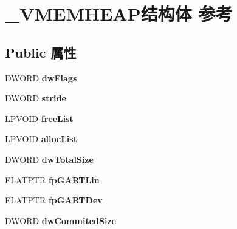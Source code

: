 \hypertarget{struct___v_m_e_m_h_e_a_p}{}\section{\+\_\+\+V\+M\+E\+M\+H\+E\+A\+P结构体 参考}
\label{struct___v_m_e_m_h_e_a_p}
\subsection*{Public 属性}
\begin{DoxyCompactItemize}
\item 
\mbox{\label{struct___v_m_e_m_h_e_a_p_a2c2e0ecc73e07e5429ab45ea08a7a520}} 
D\+W\+O\+RD {\bfseries dw\+Flags}
\item 
\mbox{\label{struct___v_m_e_m_h_e_a_p_ab3588bc7d431e168e2baeb458e2e80e3}} 
D\+W\+O\+RD {\bfseries stride}
\item 
\mbox{\label{struct___v_m_e_m_h_e_a_p_ae31973e475c99d219a4be7fc5602da03}} 
\hyperlink{interfacevoid}{L\+P\+V\+O\+ID} {\bfseries free\+List}
\item 
\mbox{\label{struct___v_m_e_m_h_e_a_p_a73a0185346b7d2133a8cb1a777658a55}} 
\hyperlink{interfacevoid}{L\+P\+V\+O\+ID} {\bfseries alloc\+List}
\item 
\mbox{\label{struct___v_m_e_m_h_e_a_p_a07a7fc091f445413a3bf8451b9fa85d4}} 
D\+W\+O\+RD {\bfseries dw\+Total\+Size}
\item 
\mbox{\label{struct___v_m_e_m_h_e_a_p_a1f7ba100fd6c0f8c33cf08e082785485}} 
F\+L\+A\+T\+P\+TR {\bfseries fp\+G\+A\+R\+T\+Lin}
\item 
\mbox{\label{struct___v_m_e_m_h_e_a_p_adb7a85ffe6408f8ee946ae231e4fb158}} 
F\+L\+A\+T\+P\+TR {\bfseries fp\+G\+A\+R\+T\+Dev}
\item 
\mbox{\label{struct___v_m_e_m_h_e_a_p_a80bc66f5ea35c5b69baa1ac4151f7a9d}} 
D\+W\+O\+RD {\bfseries dw\+Commited\+Size}
\item 
\mbox{\label{struct___v_m_e_m_h_e_a_p_ac2941daa21a17ea046031e2e423080da}} 

\end{DoxyCompactItemize}
